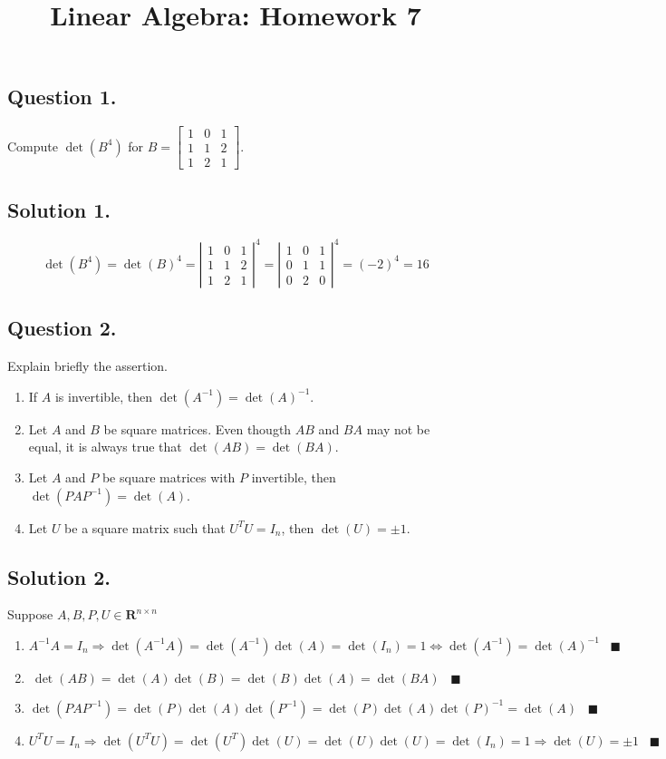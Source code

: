 \documentclass{article}
\title{Linear Algebra: Homework 7}
\begin{document}
\maketitle
\subsection*{Question 1.}
Compute $\det{(B^4)}$ for $B=\left[\begin{array}{rrrr}
1 & 0 & 1 \\1 &1&2\\1&2&1 
\end{array}\right]$.
\subsection*{Solution 1.}
\[\det(B^4)=\det(B)^4=\left\vert\begin{array}{rrrr}
1 & 0 & 1 \\1 &1&2\\1&2&1 
\end{array}\right\vert^4=\left\vert\begin{array}{rrrr}
1 & 0 & 1 \\0 &1&1\\0&2&0 
\end{array}\right\vert^4=(-2)^4=16\]
\subsection*{Question 2.}
Explain briefly the assertion.
\begin{enumerate} [label=(\arabic*)]
    \item If $A$ is invertible, then $\det(A^{-1})=\det(A)^{-1}$.
    \item Let $A$ and $B$ be square matrices. Even thougth $AB$ and $BA$ may not be equal, it is always true that $\det(AB)=\det(BA)$.
    \item Let $A$ and $P$ be square matrices with $P$ invertible, then $\det(PAP^{-1})=\det(A)$.
    \item Let $U$ be a square matrix such that $U^TU=I_n$, then $\det(U)=\pm 1$.
\end{enumerate} 
\subsection*{Solution 2.}
Suppose $A,B,P,U\in\mathbf{R}^{n\times n}$
\begin{enumerate} [label=(\arabic*)]
    \item \[A^{-1}A=I_n\Rightarrow \det(A^{-1}A)=\det(A^{-1})\det(A)=\det(I_n)=1\Leftrightarrow \det(A^{-1})=\det(A)^{-1}\,\,\,\,\,\blacksquare\]
    \item \[\det(AB)=\det(A)\det(B)=\det(B)\det(A)=\det(BA)\,\,\,\,\,\blacksquare\]
    \item \[\det(PAP^{-1})=\det(P)\det(A)\det(P^{-1})=\det(P)\det(A)\det(P)^{-1}=\det(A)\,\,\,\,\,\blacksquare\]
    \item \[U^TU=I_n\Rightarrow \det(U^TU)=\det(U^T)\det(U)=\det(U)\det(U)=\det(I_n)=1\Rightarrow \det(U)=\pm 1\,\,\,\,\,\blacksquare\]
\end{enumerate}
\end{document}
